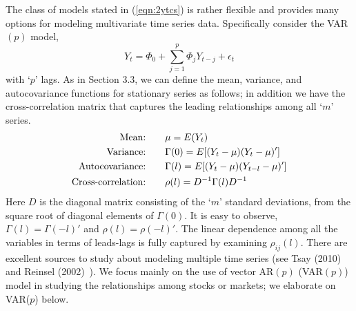The class of models stated in (\ref{eqn:2ytcs}) is rather flexible and provides many options for modeling multivariate time series data. Specifically consider the VAR$(p)$ model,
	\begin{equation}\label{eqn:ytphi0}
	Y_{t} = \Phi_0 + \sum_{j=1}^{p}\Phi_jY_{t-j}+\epsilon_t 
	\end{equation}
with `$p$' lags. As in Section 3.3, we can define the mean, variance, and autocovariance functions for stationary series as follows; in addition we have the cross-correlation matrix that captures the leading relationships among all `$m$' series.
	\begin{equation} \label{eq:meanvarianceauto}
        \begin{split}
                    \text{Mean:\qquad} & \mu= E(Y_t) \\
                    \text{Variance:\qquad} & \Gamma(0)= E[(Y_t-\mu)(Y_t-\mu)'] \\
                    \text{Autocovariance:\qquad} & \Gamma(l)= E[(Y_t-\mu)(Y_{t-l}-\mu)'] \\
                    \text{Cross-correlation:\qquad} & \rho(l) = D^{-1}\Gamma(l) D^{-1}
        \end{split}
        \end{equation}
Here $D$ is the diagonal matrix consisting of the `$m$' standard deviations, from the square root of diagonal elements of $\Gamma(0)$. It is easy to observe,  $\Gamma(l)= \Gamma(-l)'$ and $\rho(l)=\rho(-l)'$. The linear dependence among all the variables in terms of leads-lags is fully captured by examining $\rho_{ij}(l)$. There are excellent sources to study about modeling multiple time series (see Tsay (2010)~\cite{tsay} and Reinsel (2002)~\cite{2002reinsel}). We focus mainly on the use of vector AR$(p)$ (VAR$(p)$) model in studying the relationships among stocks or markets; we elaborate on VAR($p$) below.


